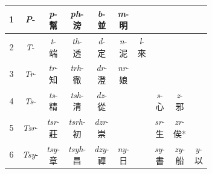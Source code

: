 \begin{table}[bp]
    \centering
    \begin{tabular}{|c|c|c|c|c|c|c|c|c|c|} \hline 
         1& \textit{P}-  & \makecell[l]{\textit{p}- \\幫}  & \makecell[l]{\textit{ph}- \\滂} & \makecell[l]{\textit{b}- \\ 並}  & \makecell[l]{\textit{m}- \\明}  &  &  &  & \\ \hline 
         2& \textit{T}-  & \makecell[l]{\textit{t}-\\端} & \makecell[l]{\textit{th}-\\透}  & \makecell[l]{\textit{d}-\\定}  & \makecell[l]{\textit{n}- \\泥} & \makecell[l]{\textit{l}-\\來} &  &  & \\ \hline 
         3& \textit{Tr}-  & \makecell[l]{\textit{tr}- \\知} & \makecell[l]{\textit{trh}- \\徹}  & \makecell[l]{\textit{dr}-\\澄}  & \makecell[l]{\textit{nr}-\\娘} &  &  &  & \\ \hline 
         4& \textit{Ts}-  & \makecell[l]{\textit{ts}-\\精} & \makecell[l]{\textit{tsh}-\\清}  & \makecell[l]{\textit{dz}-\\從} &  &  & \makecell[l]{\textit{s}-\\心} & \makecell[l]{\textit{z}- \\邪} & \\ \hline 
         5& \textit{Tsr}-  & \makecell[l]{\textit{tsr}-\\莊}  & \makecell[l]{\textit{tsrh}-\\初} & \makecell[l]{\textit{dzr}-\\崇} &  &  & \makecell[l]{\textit{sr}-\\生} & \makecell[l]{\textit{zr}-\\俟*} & \\ \hline 
         6& \textit{Tsy}-  & \makecell[l]{\textit{tsy}-\\章}  & \makecell[l]{\textit{tsyh}-\\昌} & \makecell[l]{\textit{dzy}-\\禪} & \makecell[l]{\textit{ny}-\\日} &  & \makecell[l]{\textit{sy}-\\書} & \makecell[l]{\textit{zy}-\\船} & \makecell[l]{\textit{y}-\\以} \\ \hline 

\end{tabular}
\end{table}
